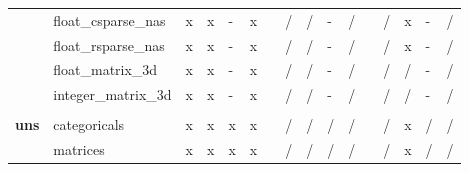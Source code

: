 \documentclass{article}
\begin{document}
\begin{longtable}{llllllllllllllll}
                & float\_csparse\_nas       & \cellcolor[HTML]{B7E1CD}x & \cellcolor[HTML]{B7E1CD}x & \cellcolor[HTML]{CFE2F3}- & \cellcolor[HTML]{B7E1CD}x &  & \cellcolor[HTML]{F4CCCC}/ & \cellcolor[HTML]{F4CCCC}/ & \cellcolor[HTML]{CFE2F3}- & \cellcolor[HTML]{F4CCCC}/ &  & \cellcolor[HTML]{F4CCCC}/ & \cellcolor[HTML]{B7E1CD}x & \cellcolor[HTML]{CFE2F3}- & \cellcolor[HTML]{F4CCCC}/ \\
                & float\_rsparse\_nas       & \cellcolor[HTML]{B7E1CD}x & \cellcolor[HTML]{B7E1CD}x & \cellcolor[HTML]{CFE2F3}- & \cellcolor[HTML]{B7E1CD}x &  & \cellcolor[HTML]{F4CCCC}/ & \cellcolor[HTML]{F4CCCC}/ & \cellcolor[HTML]{CFE2F3}- & \cellcolor[HTML]{F4CCCC}/ &  & \cellcolor[HTML]{F4CCCC}/ & \cellcolor[HTML]{B7E1CD}x & \cellcolor[HTML]{CFE2F3}- & \cellcolor[HTML]{F4CCCC}/ \\
                & float\_matrix\_3d         & \cellcolor[HTML]{B7E1CD}x & \cellcolor[HTML]{B7E1CD}x & \cellcolor[HTML]{CFE2F3}- & \cellcolor[HTML]{B7E1CD}x &  & \cellcolor[HTML]{F4CCCC}/ & \cellcolor[HTML]{F4CCCC}/ & \cellcolor[HTML]{CFE2F3}- & \cellcolor[HTML]{F4CCCC}/ &  & \cellcolor[HTML]{F4CCCC}/ & \cellcolor[HTML]{F4CCCC}/ & \cellcolor[HTML]{CFE2F3}- & \cellcolor[HTML]{F4CCCC}/ \\
                & integer\_matrix\_3d       & \cellcolor[HTML]{B7E1CD}x & \cellcolor[HTML]{B7E1CD}x & \cellcolor[HTML]{CFE2F3}- & \cellcolor[HTML]{B7E1CD}x &  & \cellcolor[HTML]{F4CCCC}/ & \cellcolor[HTML]{F4CCCC}/ & \cellcolor[HTML]{CFE2F3}- & \cellcolor[HTML]{F4CCCC}/ &  & \cellcolor[HTML]{F4CCCC}/ & \cellcolor[HTML]{F4CCCC}/ & \cellcolor[HTML]{CFE2F3}- & \cellcolor[HTML]{F4CCCC}/ \\
                &                           &                           &                           &                           &                           &  &                           &                           &                           &                           &  &                           &                           &                           &                           \\
\textbf{uns}    & categoricals              & \cellcolor[HTML]{B7E1CD}x & \cellcolor[HTML]{B7E1CD}x & \cellcolor[HTML]{B7E1CD}x & \cellcolor[HTML]{B7E1CD}x &  & \cellcolor[HTML]{F4CCCC}/ & \cellcolor[HTML]{F4CCCC}/ & \cellcolor[HTML]{F4CCCC}/ & \cellcolor[HTML]{F4CCCC}/ &  & \cellcolor[HTML]{F4CCCC}/ & \cellcolor[HTML]{B7E1CD}x & \cellcolor[HTML]{F4CCCC}/ & \cellcolor[HTML]{F4CCCC}/ \\
                & matrices                  & \cellcolor[HTML]{B7E1CD}x & \cellcolor[HTML]{B7E1CD}x & \cellcolor[HTML]{B7E1CD}x & \cellcolor[HTML]{B7E1CD}x &  & \cellcolor[HTML]{F4CCCC}/ & \cellcolor[HTML]{F4CCCC}/ & \cellcolor[HTML]{F4CCCC}/ & \cellcolor[HTML]{F4CCCC}/ &  & \cellcolor[HTML]{F4CCCC}/ & \cellcolor[HTML]{B7E1CD}x & \cellcolor[HTML]{F4CCCC}/ & \cellcolor[HTML]{F4CCCC}/ \\

\end{longtable}
\end{document}
